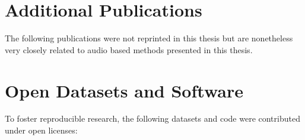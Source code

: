 \section*{Additional Publications}
The following publications were not reprinted in this thesis but are nonetheless very closely related to audio based methods presented in this thesis.
\begin{refsection}
\nocite{*}
\printbibliography[env=numbered+bold, heading=none,resetnumbers=true, sorting=ynt]
\newrefcontext[sorting=nyt]
\end{refsection}

\section*{Open Datasets and Software}
To foster reproducible research, the following datasets and code were contributed under open licenses:
\begin{refsection}
\nocite{*}
\printbibliography[env=numbered+bold, heading=none,resetnumbers=true, sorting=ynt]
\newrefcontext[sorting=nyt]
\end{refsection}

